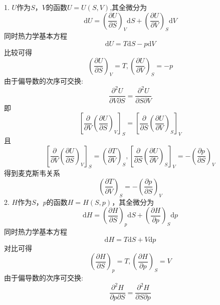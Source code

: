 1.
$U$作为$S$，$V$的函数$U=U(S,V)$,其全微分为
\begin{equation}
    \mathrm{d}U=\left( \frac{\partial U}{\partial S} \right) _V\mathrm{d}S+\left( \frac{\partial U}{\partial V} \right) _S\mathrm{d}V
\end{equation}
同时热力学基本方程
\begin{equation}
    \mathrm{d}U=T\mathrm{d}S-p\mathrm{d}V
\end{equation}
比较可得
\begin{equation}
    \left( \frac{\partial U}{\partial S} \right) _V=T,\left( \frac{\partial U}{\partial V} \right) _S=-p
\end{equation}
由于偏导数的次序可交换: 
\begin{equation}
    \frac{\partial ^2U}{\partial V\partial S}=\frac{\partial ^2U}{\partial S\partial V}
\end{equation}
即
\begin{equation}
    \left[ \frac{\partial}{\partial V}\left( \frac{\partial U}{\partial S} \right) _V \right] _S=\left[ \frac{\partial}{\partial S}\left( \frac{\partial U}{\partial V} \right) _S \right] _V
\end{equation}
且
\begin{equation}
    \left[ \frac{\partial}{\partial V}\left( \frac{\partial U}{\partial S} \right) _V \right] _S=\left( \frac{\partial T}{\partial V} \right) _S,\left[ \frac{\partial}{\partial S}\left( \frac{\partial U}{\partial V} \right) _S \right] _V=-\left( \frac{\partial p}{\partial S} \right) _V
\end{equation}
得到麦克斯韦关系
\begin{equation}
    \left( \frac{\partial T}{\partial V} \right) _S=-\left( \frac{\partial p}{\partial S} \right) _V
\end{equation}
2.
$H$作为$S$，$p$的函数$H=H(S,p)$，其全微分为
\begin{equation}
    \mathrm{d}H=\left( \frac{\partial H}{\partial S} \right) _{p}\mathrm{d}S+\left( \frac{\partial H}{\partial p} \right) _{S}\mathrm{d}p
\end{equation}
同时热力学基本方程
\begin{equation}
    \mathrm{d}H=T\mathrm{d}S+V\mathrm{d}p
\end{equation}
对比可得
\begin{equation}
    \left( \frac{\partial H}{\partial S} \right) _{p}=T,\left( \frac{\partial H}{\partial p} \right) _{S}=V
\end{equation}
由于偏导数的次序可交换: 
\begin{equation}
    \frac{\partial ^2H}{\partial p\partial S}=\frac{\partial ^2H}{\partial S\partial p}
\end{equation}
